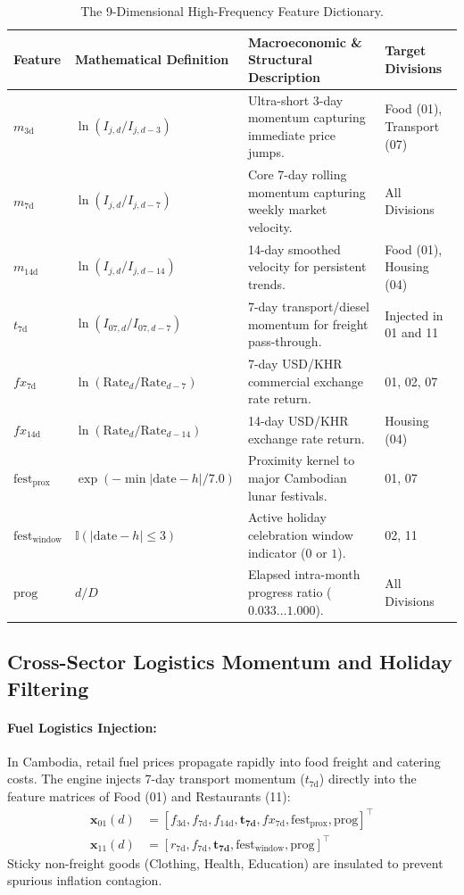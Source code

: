 \documentclass[a4paper, 11pt]{article}
\begin{document}
\begin{table}[H]
\centering
\small
\begin{tabularx}{\textwidth}{@{}llXl@{}}
\toprule
\textbf{Feature} & \textbf{Mathematical Definition} & \textbf{Macroeconomic \& Structural Description} & \textbf{Target Divisions} \\ \midrule
$m_{3\text{d}}$ & $\ln(I_{j, d} / I_{j, d-3})$ & Ultra-short 3-day momentum capturing immediate price jumps. & Food (01), Transport (07) \\
$m_{7\text{d}}$ & $\ln(I_{j, d} / I_{j, d-7})$ & Core 7-day rolling momentum capturing weekly market velocity. & All Divisions \\
$m_{14\text{d}}$ & $\ln(I_{j, d} / I_{j, d-14})$ & 14-day smoothed velocity for persistent trends. & Food (01), Housing (04) \\
$t_{7\text{d}}$ & $\ln(I_{07, d} / I_{07, d-7})$ & 7-day transport/diesel momentum for freight pass-through. & Injected in 01 and 11 \\
$fx_{7\text{d}}$ & $\ln(\text{Rate}_d / \text{Rate}_{d-7})$ & 7-day USD/KHR commercial exchange rate return. & 01, 02, 07 \\
$fx_{14\text{d}}$ & $\ln(\text{Rate}_d / \text{Rate}_{d-14})$ & 14-day USD/KHR exchange rate return. & Housing (04) \\
$\text{fest}_{\text{prox}}$ & $\exp(-\min |\text{date} - h| / 7.0)$ & Proximity kernel to major Cambodian lunar festivals. & 01, 07 \\
$\text{fest}_{\text{window}}$ & $\mathbb{I}(|\text{date} - h| \le 3)$ & Active holiday celebration window indicator ($0$ or $1$). & 02, 11 \\
$\text{prog}$ & $d / D$ & Elapsed intra-month progress ratio ($0.033 \dots 1.000$). & All Divisions \\ \bottomrule
\end{tabularx}
\caption{The 9-Dimensional High-Frequency Feature Dictionary.}
\label{tab:features}
\end{table}

\subsection{Cross-Sector Logistics Momentum and Holiday Filtering}
\paragraph{Fuel Logistics Injection:}
In Cambodia, retail fuel prices propagate rapidly into food freight and catering costs. The engine injects 7-day transport momentum ($t_{7\text{d}}$) directly into the feature matrices of Food (01) and Restaurants (11):
\begin{align}
    \mathbf{x}_{01}(d) &= \left[ f_{3\text{d}}, f_{7\text{d}}, f_{14\text{d}}, \mathbf{t_{7\text{d}}}, fx_{7\text{d}}, \text{fest}_{\text{prox}}, \text{prog} \right]^\top \\
    \mathbf{x}_{11}(d) &= \left[ r_{7\text{d}}, f_{7\text{d}}, \mathbf{t_{7\text{d}}}, \text{fest}_{\text{window}}, \text{prog} \right]^\top
\end{align}
Sticky non-freight goods (Clothing, Health, Education) are insulated to prevent spurious inflation contagion.
\end{document}
